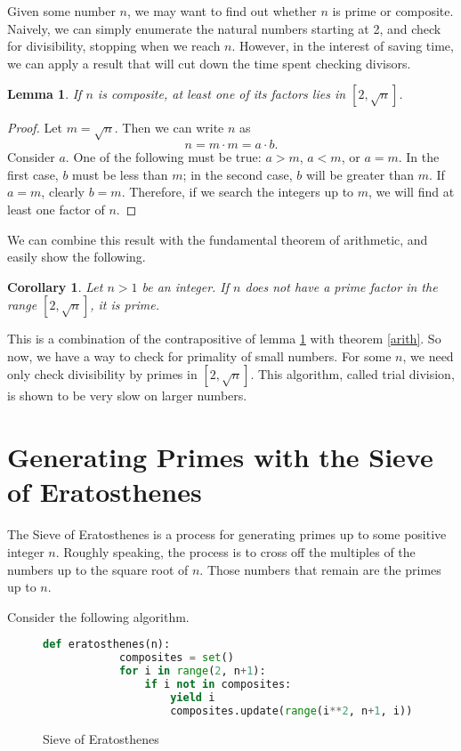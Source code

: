\documentclass{amsart}
\newtheorem{lem}{Lemma}
\newtheorem{cor}{Corollary}
\theoremstyle{definition}
\theoremstyle{case}
\begin{document}
	Given some number $n$, we may want to find out whether $n$ is prime or composite. Naively, we can simply enumerate the natural numbers starting at 2, and check for divisibility, stopping when we reach $n$. However, in the interest of saving time, we can apply a result that will cut down the time spent checking divisors.
	\begin{lem}\label{sqrt}
		If $n$ is composite, at least one of its factors lies in $[2, \sqrt{n}]$.
	\end{lem}
	\begin{proof}
		Let $m = \sqrt{n}$. Then we can write $n$ as
		$$ n = m \cdot m = a \cdot b . $$
		Consider $a$. One of the following must be true: $a>m$, $a<m$, or $a=m$. In the first case, $b$ must be less than $m$; in the second case, $b$ will be greater than $m$. If $a=m$, clearly $b=m$. Therefore, if we search the integers up to $m$, we will find at least one factor of $n$.
	\end{proof}
	
	We can combine this result with the fundamental theorem of arithmetic, and easily show the following.
	\begin{cor}\label{corprime}
		Let $n>1$ be an integer. If $n$ does not have a prime factor in the range $[2, \sqrt{n}]$, it is prime.
	\end{cor}
	This is a combination of the contrapositive of lemma \ref{sqrt} with theorem \ref{arith}. So now, we have a way to check for primality of small numbers. For some $n$, we need only check divisibility by primes in $[2, \sqrt{n}]$. This algorithm, called trial division, is shown to be very slow on larger numbers. 
	
	
	
	\section{Generating Primes with the Sieve of Eratosthenes}
	
	The Sieve of Eratosthenes is a process for generating primes up to some positive integer $n$. Roughly speaking, the process is to cross off the multiples of the numbers up to the square root of $n$. Those numbers that remain are the primes up to $n$.
	
	Consider the following algorithm.
	
	\begin{figure}[H]\caption{Sieve of Eratosthenes}
		\begin{lstlisting}[language=Python]
		def eratosthenes(n):
		    composites = set()
		    for i in range(2, n+1):
		        if i not in composites:
		            yield i
		            composites.update(range(i**2, n+1, i))
		\end{lstlisting}
	\end{figure}
	
\end{document}
